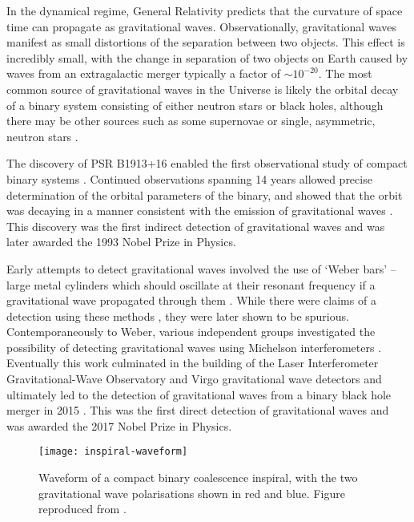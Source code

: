 In the dynamical regime, General Relativity predicts that the curvature of space time can propagate as gravitational waves. Observationally, gravitational waves manifest as small distortions of the separation between two objects. This effect is incredibly small, with the change in separation of two objects on Earth caused by waves from an extragalactic merger typically a factor of $\sim 10^{-20}$. The most common source of gravitational waves in the Universe is likely the orbital decay of a binary system consisting of either neutron stars or black holes, although there may be other sources such as some supernovae \citep{2009CQGra..26f3001O,2019ApJ...876L...9R} or single, asymmetric, neutron stars \citep{2009ASSL..357..651P}.

The discovery of PSR B1913+16 enabled the first observational study of compact binary systems \citep{1975ApJ...195L..51H}. Continued observations spanning 14 years allowed precise determination of the orbital parameters of the binary, and showed that the orbit was decaying in a manner consistent with the emission of gravitational waves \citep{1989ApJ...345..434T}. This discovery was the first indirect detection of gravitational waves and was later awarded the 1993 Nobel Prize in Physics.

Early attempts to detect gravitational waves involved the use of `Weber bars' -- large metal cylinders which should oscillate at their resonant frequency if a gravitational wave propagated through them \citep{1960PhRv..117..306W}. While there were claims of a detection using these methods \citep[e.g.][]{1969PhRvL..22.1320W}, they were later shown to be spurious. Contemporaneously to Weber, various independent groups \citep{2016Univ....2...22C} investigated the possibility of detecting gravitational waves using Michelson interferometers \citep{1887AmJS...34..333M}. Eventually this work culminated in the building of the Laser Interferometer Gravitational-Wave Observatory \citep[LIGO;][]{2015CQGra..32g4001L} and Virgo \citep{2015CQGra..32b4001A} gravitational wave detectors and ultimately led to the detection of gravitational waves from a binary black hole merger in 2015 \citep{2016PhRvL.116f1102A}. This was the first direct detection of gravitational waves and was awarded the 2017 Nobel Prize in Physics.

\begin{figure}
    \centering
    \texttt{[image: inspiral-waveform]}
    \caption[Waveform of a compact binary coalescence inspiral]{Waveform of a compact binary coalescence inspiral, with the two gravitational wave polarisations shown in red and blue. Figure reproduced from \citet{2015PhDT.........6S}.}
    \label{fig:inspiral-waveform}
\end{figure}

